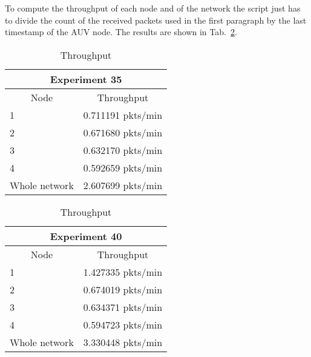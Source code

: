 \documentclass[a4paper,oneside]{article}
\begin{document}
To compute the throughput of each node and of the network the script
just has to divide the count of the received packets used in the first
paragraph by the last timestamp of the AUV node. The results are shown
in Tab.~\ref{tab:thr}.
\begin{table}[h]
  \centering
  \begin{subtable}{0.5\textwidth}
    \centering
    \begin{tabular}{lr}
      \multicolumn{2}{c}{Experiment 35} \\
      \hline
      \multicolumn{1}{c}{Node} & \multicolumn{1}{c}{Throughput} \\
      1 & 0.711191 pkts/min \\
      2 & 0.671680 pkts/min \\
      3 & 0.632170 pkts/min \\
      4 & 0.592659 pkts/min \\
      Whole network & 2.607699 pkts/min
    \end{tabular}
  \end{subtable}%
  \begin{subtable}{0.5\textwidth}
    \centering
    \begin{tabular}{lr}
      \multicolumn{2}{c}{Experiment 40} \\
      \hline
      \multicolumn{1}{c}{Node} & \multicolumn{1}{c}{Throughput} \\
      1 & 1.427335 pkts/min \\
      2 & 0.674019 pkts/min \\
      3 & 0.634371 pkts/min \\
      4 & 0.594723 pkts/min \\
      Whole network & 3.330448 pkts/min
    \end{tabular}
  \end{subtable}
  \caption{Throughput}
  \label{tab:thr}
\end{table}
\end{document}
